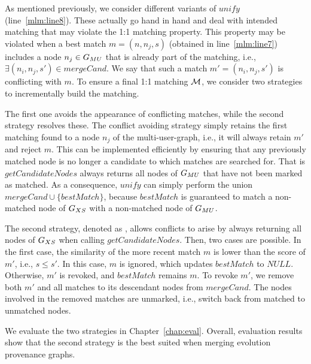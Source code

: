     
 As mentioned previously, we consider different variants of $unify$ (line~\ref{mlm:line8}). 
These actually go hand in hand and deal with intended matching that may violate the 1:1 matching property.
  This property may be violated when a best match $m = (n, n_j, s)$ (obtained in line~\ref{mlm:line7}) includes a node $n_j \in G_{MU}$ that is already part of the matching, i.e., $\exists (n_i, n_j, s') \in mergeCand$. We say that such a match $m' = (n_i, n_j, s')$ is conflicting with $m$. To ensure a  final 1:1 matching ${\mathcal M}$, we consider two strategies to incrementally build the matching. 
 
 The first one avoids the appearance of conflicting matches, while the second strategy resolves these.  
 The conflict avoiding strategy \ca{} simply retains the first matching found to a node $n_j$ of the multi-user-graph, i.e., it will always retain $m'$ and reject $m$. This can be implemented efficiently by ensuring that any previously matched node is no longer a candidate to which matches are searched for. That is $getCandidateNodes$ always returns all nodes of $G_{MU}$ that have not been marked as matched. As a consequence, $unify$ can simply perform the union $mergeCand \cup \{bestMatch\}$, because $bestMatch$ is guaranteed to match a non-matched node of $G_{XS}$ with a non-matched node of $G_{MU}{}$.
 
 The second strategy, denoted as \cres{}, allows conflicts to arise by always returning all nodes of $G_{XS}$ when calling $getCandidateNodes$. Then, two cases are possible. In the first case, the similarity of the more recent match $m$ is lower than the score of $m'$, i.e., $s \leq s'$. In this case, $m$ is ignored, which updates $bestMatch$ to $NULL$. Otherwise, $m'$ is revoked, and $bestMatch$ remains $m$. To revoke $m'$, we remove both $m'$ and all matches to its descendant nodes from $mergeCand$. The nodes involved in the removed matches are unmarked, i.e., switch back from matched to unmatched nodes. 
 
We evaluate  the two strategies in Chapter~\ref{chap:eval}.
Overall, evaluation results show that the second strategy \cres{} is the best suited when merging evolution provenance graphs.
 
